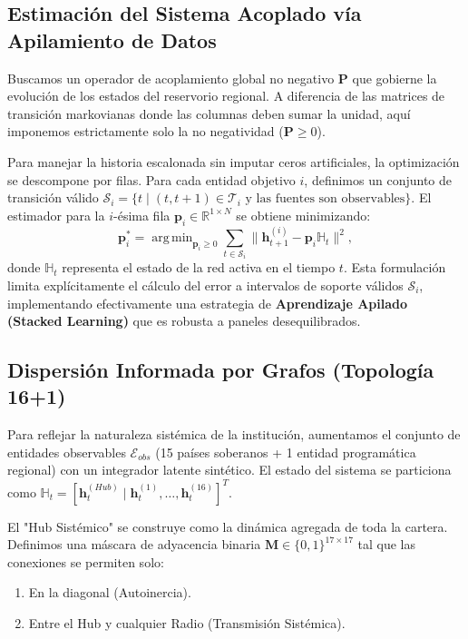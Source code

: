 \documentclass[11pt, letterpaper]{report}
\DeclareMathOperator*{\argmin}{arg\,min}
\newcommand{\mat}[1]{\mathbf{#1}}
\newcommand{\vect}[1]{\mathbf{#1}}
\newcommand{\supermat}[1]{\mathbb{#1}}
\begin{document}
\subsection{Estimación del Sistema Acoplado vía Apilamiento de Datos}

Buscamos un operador de acoplamiento global no negativo $\mat{P}$ que gobierne la evolución de los estados del reservorio regional. A diferencia de las matrices de transición markovianas donde las columnas deben sumar la unidad, aquí imponemos estrictamente solo la no negatividad ($\mat{P} \ge 0$).

Para manejar la historia escalonada sin imputar ceros artificiales, la optimización se descompone por filas. Para cada entidad objetivo $i$, definimos un conjunto de transición válido $\mathcal{S}_i = \{t \mid (t, t+1) \in \mathcal{T}_i \text{ y las fuentes son observables}\}$. El estimador para la $i$-ésima fila $\vect{p}_i \in \mathbb{R}^{1 \times N}$ se obtiene minimizando:
\begin{equation}
\vect{p}_i^* = \argmin_{\vect{p}_i \ge 0} \sum_{t \in \mathcal{S}_i} \| \vect{h}_{t+1}^{(i)} - \vect{p}_i \supermat{H}_t \|^2,
\end{equation}
donde $\supermat{H}_t$ representa el estado de la red activa en el tiempo $t$. Esta formulación limita explícitamente el cálculo del error a intervalos de soporte válidos $\mathcal{S}_i$, implementando efectivamente una estrategia de \textbf{Aprendizaje Apilado (Stacked Learning)} \cite{lawson1995solving} que es robusta a paneles desequilibrados.

\subsection{Dispersión Informada por Grafos (Topología 16+1)}

Para reflejar la naturaleza sistémica de la institución, aumentamos el conjunto de entidades observables $\mathcal{E}_{obs}$ (15 países soberanos + 1 entidad programática regional) con un integrador latente sintético. El estado del sistema se particiona como $\supermat{H}_t = [\vect{h}_t^{(Hub)} \mid \vect{h}_t^{(1)}, \dots, \vect{h}_t^{(16)}]^T$.

El "Hub Sistémico" se construye como la dinámica agregada de toda la cartera. Definimos una máscara de adyacencia binaria $\mat{M} \in \{0,1\}^{17 \times 17}$ tal que las conexiones se permiten solo:
\begin{enumerate}
    \item En la diagonal (Autoinercia).
    \item Entre el Hub y cualquier Radio (Transmisión Sistémica).
\end{enumerate}
\end{document}
